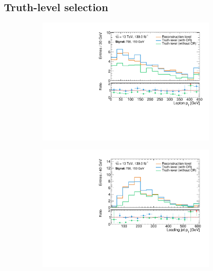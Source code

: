 \subsection{Truth-level selection}\label{sec:truth_selection}

 \begin{figure}
	\centering
	\begin{subfigure}[b]{0.49\linewidth}
		\centering\includegraphics[width=\textwidth]{20210324_noLabel_noOR/700_150/lep1Pt_C1N2_Wh_hbb_700p0_150p0_smeared.pdf}
	\end{subfigure}\hfill
	\begin{subfigure}[b]{0.49\linewidth}
		\centering\includegraphics[width=\textwidth]{20210324_noLabel_noOR/700_150/jet1Pt_C1N2_Wh_hbb_700p0_150p0_smeared.pdf}
	\end{subfigure}\hfill

\end{figure}
